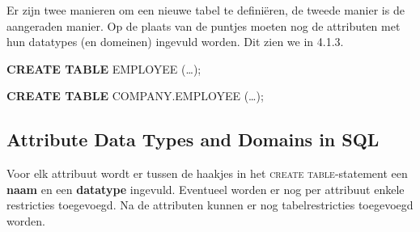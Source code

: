 Er zijn twee manieren om een nieuwe tabel te defini\"eren, de tweede manier is de aangeraden manier. Op de plaats van de puntjes moeten nog de attributen met hun datatypes (en domeinen) ingevuld worden. Dit zien we in 4.1.3.

\vspace{1mm}\hspace{10mm}
\textbf{CREATE TABLE} EMPLOYEE (\dots);

\hspace{10mm}
\textbf{CREATE TABLE} COMPANY.EMPLOYEE (\dots);


\subsection{Attribute Data Types and Domains in SQL}
Voor elk attribuut wordt er tussen de haakjes in het \textsc{create table}-statement een \textbf{naam} en een \textbf{datatype} ingevuld. Eventueel worden er nog per attribuut enkele restricties toegevoegd. Na de attributen kunnen er nog tabelrestricties toegevoegd worden.

